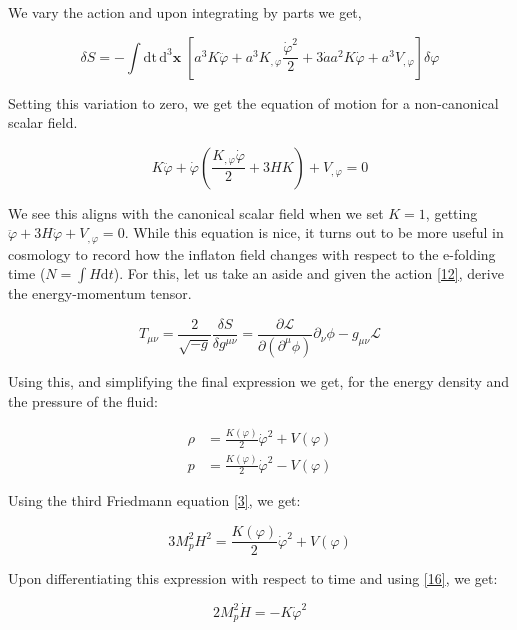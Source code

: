 \documentclass[aps,prd,reprint,preprintnumbers,showpacs,floatfix,nofootinbib,superscript address]{revtex4-2}
\begin{document}
We vary the action and upon integrating by parts we get,

\begin{equation}
    \delta S = - \int \text{dt}\,\text{d}^3\textbf{x} \; \left[ a^3 K \ddot{\varphi} + a^3K_{,\varphi} \frac{\dot{\varphi}^2}{2}  +  3\dot{a} a^2 K \dot{\varphi} + a^3V_{,\varphi}  \right]\delta \varphi
\end{equation}

Setting this variation to zero, we get the equation of motion for a non-canonical scalar field.

\begin{equation} \label{16}
    K \ddot{\varphi} + \dot{\varphi} \left(\frac{K_{,\varphi} \dot{\varphi}}{2} + 3H K \right) + V_{,\varphi}   = 0
\end{equation}

We see this aligns with the canonical scalar field when we set $K = 1$, getting  $ \ddot{\varphi} +  3H \dot{\varphi}  + V_{,\varphi}   = 0$. While this equation is nice, it turns out to be more useful in cosmology to record how the inflaton field changes with respect to the e-folding time ($N = \int H \text{d}t$). For this, let us take an aside and given the action \ref{12}, derive the energy-momentum tensor.

\begin{equation}
    T_{\mu\nu} = \frac{2}{\sqrt{-g}} \frac{\delta S}{\delta  g^{\mu \nu}} = \frac{\partial \mathcal{L}}{\partial (\partial^\mu \phi)} \partial_\nu \phi - g_{\mu\nu} \mathcal{L}
\end{equation}

Using this, and simplifying the final expression we get, for the energy density and the pressure of the fluid: 

\begin{align}
    \rho &= \frac{K(\varphi)}{2} \dot{\varphi}^2 + V(\varphi) \nonumber \\
    p &= \frac{K(\varphi)}{2} \dot{\varphi}^2 - V(\varphi)
\end{align}

Using the third Friedmann equation \ref{3}, we get:

\begin{equation}    \label{Friedmann Eqn 2}
    3 M_p^2H^2 = \frac{K(\varphi)}{2} \dot{\varphi}^2 + V(\varphi)
\end{equation}

Upon differentiating this expression with respect to time and using \ref{16}, we get:

\begin{equation}
    2 M_p^2 \dot{H} = -  K \dot{\varphi}^2
\end{equation}
\end{document}

